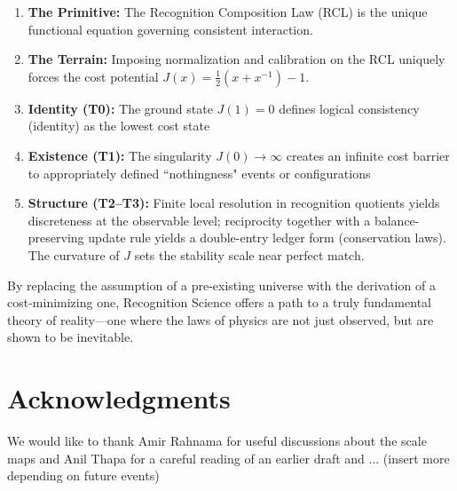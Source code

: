 \documentclass[11pt,a4paper]{article}
\begin{document}
\begin{enumerate}
    \item \textbf{The Primitive:} The Recognition Composition Law (RCL) is the unique functional equation governing consistent interaction.
    \item \textbf{The Terrain:} Imposing normalization and calibration on the RCL uniquely forces the cost potential $J(x) = \frac{1}{2}(x + x^{-1}) - 1$.
    \item \textbf{Identity (T0):} The ground state $J(1)=0$ defines logical consistency (identity) as the lowest cost state
    \item \textbf{Existence (T1):} The singularity $J(0) \to \infty$ creates an infinite cost barrier to appropriately defined ``nothingness" events or configurations
    \item \textbf{Structure (T2--T3):} Finite local resolution in recognition quotients yields discreteness at the observable level; reciprocity together with a balance-preserving update rule yields a double-entry ledger form (conservation laws). The curvature of $J$ sets the stability scale near perfect match.
\end{enumerate}

By replacing the assumption of a pre-existing universe with the derivation of a cost-minimizing one, Recognition Science offers a path to a truly fundamental theory of reality—one where the laws of physics are not just observed, but are shown to be inevitable.

\section{Acknowledgments}
We would like to thank Amir Rahnama for useful discussions about the scale maps and Anil Thapa for a careful reading of an earlier draft and ... (insert more depending on future events)



\end{document}

